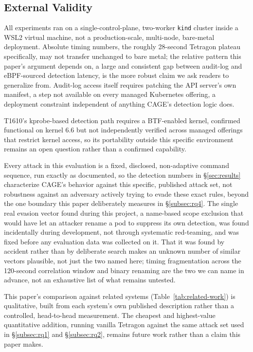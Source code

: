 \documentclass{ieeeaccess}
\begin{document}
\subsection{External Validity}
\label{subsec:external-validity}

All experiments ran on a single-control-plane, two-worker \texttt{kind}
cluster inside a WSL2 virtual machine, not a production-scale,
multi-node, bare-metal deployment. Absolute timing numbers, the
roughly 28-second Tetragon plateau specifically, may not transfer
unchanged to bare metal; the relative pattern this paper's argument
depends on, a large and consistent gap between audit-log and
eBPF-sourced detection latency, is the more robust claim we ask
readers to generalize from. Audit-log access itself requires patching
the API server's own manifest, a step not available on every managed
Kubernetes offering, a deployment constraint independent of anything
CAGE's detection logic does.

T1610's kprobe-based detection path requires a BTF-enabled kernel,
confirmed functional on kernel 6.6 but not independently verified
across managed offerings that restrict kernel access, so its
portability outside this specific environment remains an open question
rather than a confirmed capability.

Every attack in this evaluation is a fixed, disclosed, non-adaptive
command sequence, run exactly as documented, so the detection numbers
in \S\ref{sec:results} characterize CAGE's behavior against this specific,
published attack set, not robustness against an adversary actively
trying to evade these exact rules, beyond the one boundary this paper
deliberately measures in \S\ref{subsec:rq4}. The single real evasion
vector found during this project, a name-based scope exclusion that
would have let an attacker rename a pod to suppress its own detection,
was found incidentally during development, not through systematic
red-teaming, and was fixed before any evaluation data was collected on
it. That it was found by accident rather than by deliberate search
makes an unknown number of similar vectors plausible, not just the two
named here; timing fragmentation across the 120-second correlation
window and binary renaming are the two we can name in advance, not an
exhaustive list of what remains untested.

This paper's comparison against related systems (Table~\ref{tab:related-work}) is
qualitative, built from each system's own published description rather
than a controlled, head-to-head measurement. The cheapest and
highest-value quantitative addition, running vanilla Tetragon against
the same attack set used in \S\ref{subsec:rq1} and \S\ref{subsec:rq2}, remains future work
rather than a claim this paper makes.
\end{document}
